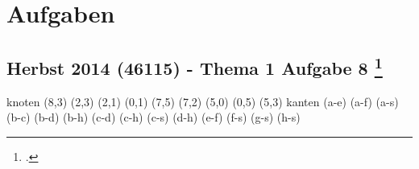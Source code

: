 \documentclass{lehramt-informatik-haupt}
\begin{document}


\chapter{Aufgaben}

\section{Herbst 2014 (46115) - Thema 1 Aufgabe 8
\footcite[Seite 2, Aufgabe 3: Tiefensuche, Breitensuche]{aud:ab:6}}

\graph knoten {
  (8,3)
  (2,3)
  (2,1)
  (0,1)
  (7,5)
  (7,2)
  (5,0)
  (0,5)
  (5,3)
} kanten {
  \kanteO(a-e)
  \kanteO(a-f)
  \kanteO(a-s)
  \kanteO(b-c)
  \kanteO(b-d)
  \kanteO(b-h)
  \kanteO(c-d)
  \kanteO(c-h)
  \kanteO(c-s)
  \kanteO(d-h)
  \kanteO(e-f)
  \kanteO(f-s)
  \kanteO(g-s)
  \kanteO(h-s)
}
\end{document}
